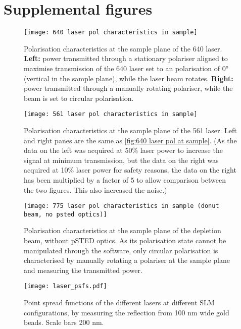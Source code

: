 \section{Supplemental figures}

\begin{figure}[h]
	\centering
	\texttt{[image: 640 laser pol characteristics in sample]}
	\caption{
		Polarisation characteristics at the sample plane of the 640 laser. \textbf{Left:} power transmitted through a stationary polariser aligned to maximise transmission of the 640 laser set to an polarisation of 0° (vertical in the sample plane), while the laser beam rotates. \textbf{Right:} power transmitted through a manually rotating polariser, while the beam is set to circular polarisation.
	}
	\label{fig:640 laser pol at sample}
\end{figure}

\begin{figure}[h]
	\centering
	\texttt{[image: 561 laser pol characteristics in sample]}
	\caption{
		Polarisation characteristics at the sample plane of the 561 laser. Left and right panes are the same as \autoref{fig:640 laser pol at sample}. (As the data on the left was acquired at 50\% laser power to increase the signal at minimum transmission, but the data on the right was acquired at 10\% laser power for safety reasons, the data on the right has been multiplied by a factor of 5 to allow comparison between the two figures. This also increased the noise.)
	}
	\label{fig:561 laser pol at sample}
\end{figure}

\begin{figure}[h]
	\centering
	\texttt{[image: 775 laser pol characteristics in sample (donut beam, no psted optics)]}
	\caption{
		Polarisation characteristics at the sample plane of the depletion beam, without pSTED optics. As its polarisation state cannot be manipulated through the software, only circular polarisation is characterised by manually rotating a polariser at the sample plane and measuring the transmitted power.
	}
	\label{fig:775 laser pol at sample}
\end{figure}

\begin{figure}[h]
	\centering
	\texttt{[image: laser\_psfs.pdf]}
	\caption{
		Point spread functions of the different lasers at different SLM configurations, by measuring the reflection from 100 nm wide gold beads. Scale bars 200 nm. 
	}
	\label{fig:normal psfs}
\end{figure}

